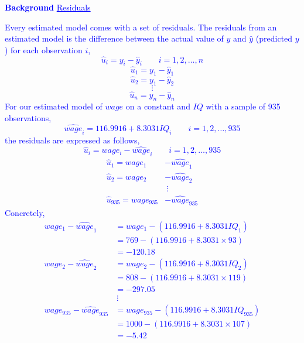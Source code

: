 \documentclass[12pt]{report}
\newenvironment{blueframed}[1][blue]
{\def\FrameCommand{\fboxsep=\FrameSep\fcolorbox{#1}{white}}%
\MakeFramed {\advance\hsize-\width \FrameRestore}}
{\endMakeFramed}
\begin{document}
\begin{blueframed}
	\textcolor{blue}{\textbf{Background}}
	\vspace{-\baselineskip}
	\justify
	\textcolor{blue}{\underline{Residuals}}
	
	\noindent \textcolor{blue}
	{
		Every estimated model comes with a set of residuals. The residuals from an estimated model is the difference between the actual value of $y$ and $\hat{y}$ (predicted $y$) for each observation $i$,
		$$\hat{u}_i = y_i-\hat{y}_i \qquad i=1,2,\dots,n$$
	}
	\textcolor{blue}
	{
		$$\hat{u}_1 = y_1-\hat{y}_1$$
		$$\hat{u}_2 = y_1-\hat{y}_2$$
		$$\vdots$$
		$$\hat{u}_n = y_n-\hat{y}_n$$
		For our estimated model of $wage$ on a constant and $IQ$ with a sample of 935 observations, $$\widehat{wage}_i = 116.9916+8.3031IQ_i \qquad i=1,2,\dots,935$$ the residuals are expressed as follows,
		$$\hat{u}_i = wage_i-\widehat{wage}_i \qquad i=1,2,\dots,935$$
		\begin{align*}
		\hat{u}_1 = wage_1&-\widehat{wage}_1 \\
		\hat{u}_2 = wage_2&-\widehat{wage}_2 \\
		&\ \vdots \\
		\hat{u}_{935} = wage_{935}&-\widehat{wage}_{935}
		\end{align*}
		Concretely,
		\begin{align*}
		wage_1-\widehat{wage}_1 &= wage_1 - (116.9916+8.3031IQ_1) \\
		&= 769-(116.9916+8.3031\times93) \\
		&= -120.18 \\
		wage_2-\widehat{wage}_2 &= wage_2 - (116.9916+8.3031IQ_2) \\
		&= 808-(116.9916+8.3031\times119) \\
		&= -297.05 \\
		&\ \vdots \\
		wage_{935}-\widehat{wage}_{935} &= wage_{935} - (116.9916+8.3031IQ_{935}) \\
		&= 1000-(116.9916+8.3031\times107) \\
		&= -5.42 
		\end{align*}
	}
\end{blueframed}
\begin{blueframed}
\begin{figure}[H]
	\centering
\end{figure}
\vspace{-\baselineskip}
\end{blueframed}
\end{document}
